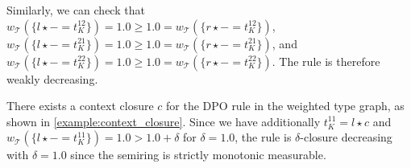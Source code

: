 \begin{example}
    Similarly, we can check that $w_\mathcal{T}(\{l \star - = t_K^{12}\}) = 1.0 \geq 1.0 = w_\mathcal{T}(\{r \star - = t_K^{12}\})$,  $w_\mathcal{T}(\{l \star - = t_K^{21}\}) = 1.0 \geq 1.0 = w_\mathcal{T}(\{r \star - = t_K^{21}\})$, and $w_\mathcal{T}(\{l \star - = t_K^{22}\}) = 1.0 \geq 1.0 = w_\mathcal{T}(\{r \star - = t_K^{22}\})$. The rule is therefore weakly decreasing.

    There exists a context closure $c$ for the DPO rule in the weighted type graph, as shown in \autoref{example:context_closure}.
    Since we have additionally $t_K^{11} = l \star c$ and $w_\mathcal{T}(\{l \star - = t_K^{11}\}) = 1.0 > 1.0 + \delta$ for $\delta = 1.0$, the rule is $\delta$-closure decreasing with $\delta = 1.0$ since the semiring is strictly monotonic measurable.

\end{example}

